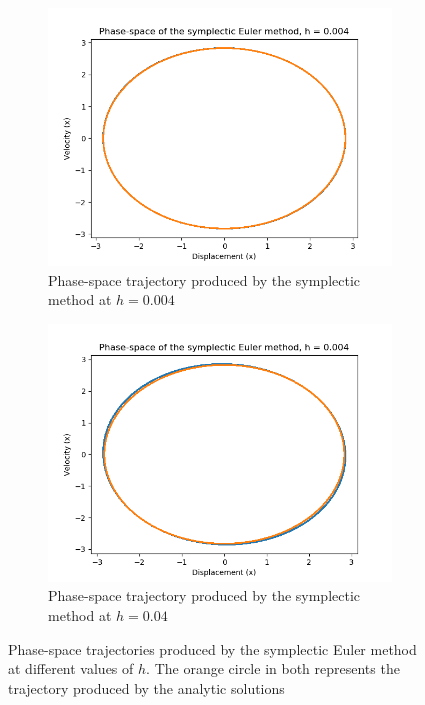 \documentclass{article}
\begin{document}
\begin{figure}[h]
    \begin{subfigure}{0.5\textwidth}
    \includegraphics[width =\textwidth]{Images/phasesymp.png}
    \caption{Phase-space trajectory produced by the symplectic method at $h=0.004$}
    \end{subfigure}
    \begin{subfigure}{0.5\textwidth}
    \includegraphics[width =\textwidth]{Images/phasesymplarge.png}
    \caption{Phase-space trajectory produced by the symplectic method at $h=0.04$}
    \end{subfigure}
    \caption{Phase-space trajectories produced by the symplectic Euler method at different values of $h$. The orange circle in both represents the trajectory produced by the analytic solutions}
    \label{fig:phasesymp}
\end{figure}
\end{document}
